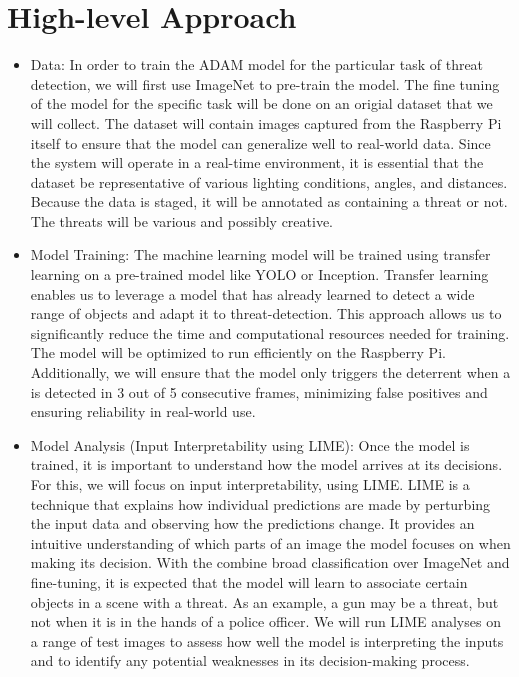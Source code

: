 \section{High-level Approach}
\begin{itemize}
    \item Data: In order to train the ADAM model for the particular task of threat detection, we will first use ImageNet to pre-train the model.
        The fine tuning of the model for the specific task will be done on an origial dataset that we will collect. 
        The dataset will contain images captured from the Raspberry Pi itself to ensure that the model can generalize well to real-world data. 
        Since the system will operate in a real-time environment, it is essential that the dataset be representative of various lighting conditions, angles, and distances. 
        Because the data is staged, it will be annotated as containing a threat or not. The threats will be various and possibly creative.
    \item Model Training: The machine learning model will be trained using transfer learning on a pre-trained model like YOLO or Inception. 
        Transfer learning enables us to leverage a model that has already learned to detect a wide range of objects and adapt it to threat-detection. 
        This approach allows us to significantly reduce the time and computational resources needed for training. 
        The model will be optimized to run efficiently on the Raspberry Pi. 
        Additionally, we will ensure that the model only triggers the deterrent when a  is detected in 3 out of 5 consecutive frames, minimizing false positives and ensuring reliability in real-world use.
    \item Model Analysis (Input Interpretability using LIME): Once the model is trained, it is important to understand how the model arrives at its decisions. 
        For this, we will focus on input interpretability, using LIME. 
        LIME is a technique that explains how individual predictions are made by perturbing the input data and observing how the predictions change. 
        It provides an intuitive understanding of which parts of an image the model focuses on when making its decision. 
        With the combine broad classification over ImageNet and fine-tuning, it is expected that the model will learn to associate certain objects in a scene with a threat. As an example, a gun may be a threat, but not when it is in the hands of a police officer.
        We will run LIME analyses on a range of test images to assess how well the model is interpreting the inputs and to identify any potential weaknesses in its decision-making process.

\end{itemize}
